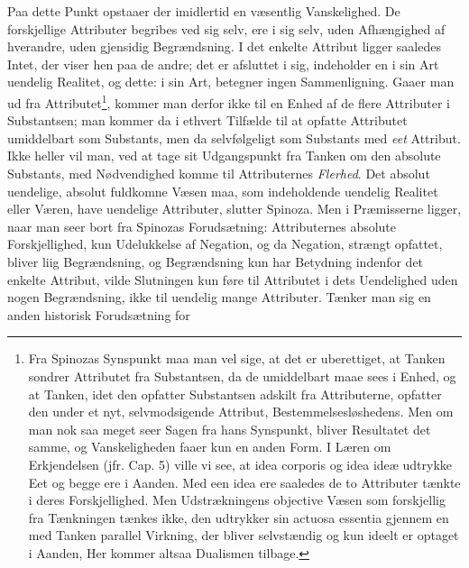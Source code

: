 \documentclass[12pt,a4paper]{book}
\newcommand{\opage}[1]{\marginnote{\footnotesize\textit{[#1]}}}
\begin{document}
Paa dette Punkt opstaaer der imidlertid en væsentlig Vanskelighed. De
forskjellige Attributer begribes ved sig selv, ere i sig selv, uden
Afhængighed af hverandre, uden gjensidig Begrændsning. I det enkelte
Attribut ligger saaledes Intet, der viser hen paa de andre; det er
afsluttet i sig, indeholder en i sin Art uendelig Realitet, og dette: i
sin Art, betegner ingen Sammenligning. Gaaer man ud fra
Attributet\footnote{Fra Spinozas Synspunkt maa man vel sige, at det er
uberettiget, at Tanken sondrer Attributet fra Substantsen, da de
umiddelbart maae sees i Enhed, og at Tanken, idet den opfatter
Substantsen adskilt fra Attributerne, opfatter den under et nyt,
selvmodsigende Attribut, Bestemmelsesløshedens. Men om man nok saa
meget seer Sagen fra hans Synspunkt, bliver Resultatet det samme, og
Vanskeligheden faaer kun en anden Form. I Læren om Erkjendelsen (jfr.
Cap. 5) ville vi see, at idea corporis og idea ideæ udtrykke Eet og
begge ere i Aanden. Med een idea ere saaledes de to Attributer tænkte i
deres Forskjellighed. Men Udstrækningens objective Væsen som
forskjellig fra Tænkningen tænkes ikke, den udtrykker sin actuosa
essentia gjennem en med Tanken parallel Virkning, der bliver
selvstændig og kun ideelt er optaget i Aanden, Her kommer altsaa
Dualismen tilbage.},
kommer man derfor ikke til en Enhed af de
\opage{51} flere Attributer i Substantsen; man kommer da i ethvert Tilfælde til at
opfatte Attributet umiddelbart som Substants, men da selvfølgeligt som
Substants med \emph{eet} Attribut. Ikke heller vil man, ved at tage sit
Udgangspunkt fra Tanken om den absolute Substants, med Nødvendighed
komme til Attributernes \emph{Flerhed}. Det absolut uendelige, absolut
fuldkomne Væsen maa, som indeholdende uendelig Realitet eller Væren,
have uendelige Attributer, slutter Spinoza. Men i Præmisserne ligger,
naar man seer bort fra Spinozas Forudsætning: Attributernes absolute
Forskjellighed, kun Udelukkelse af Negation, og da Negation, strængt
opfattet, bliver liig Begrændsning, og Begrændsning kun har Betydning
indenfor det enkelte Attribut, vilde Slutningen kun føre til Attributet
i dets Uendelighed uden nogen Begrændsning, ikke til uendelig mange
Attributer. Tænker man sig en anden historisk Forudsætning for
\end{document}
